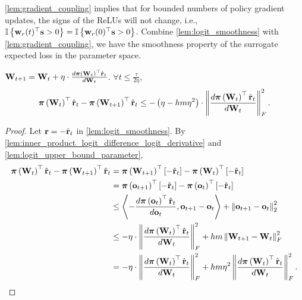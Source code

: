 \cref{lem:gradient_coupling} implies that for bounded numbers of policy gradient updates, the signs of the ReLUs will not change, i.e., ${\mathbb{I}}\left\{ {\mathbf{w}}_r(t)^\top {\mathbf{s}} > 0 \right\} = {\mathbb{I}}\left\{ {\mathbf{w}}_r(0)^\top {\mathbf{s}} > 0 \right\}$. Combine \cref{lem:logit_smoothness} with \cref{lem:gradient_coupling}, we have the smoothness property of the surrogate expected loss in the parameter space.
\begin{lem}
\label{lem:empirically_expected_reward_parameter_smoothness}
    ${\mathbf{W}}_{t+1} = {\mathbf{W}}_t + \eta \cdot \frac{d {\boldsymbol{\pi}}\left({\mathbf{W}}_t\right)^\top \hat{{\mathbf{r}}}_t}{d {\mathbf{W}}_t}$. $\forall t \le \frac{\tau}{ 2 \eta }$,
\begin{equation}
\label{eq:parameter_smoothness}
\begin{split}
    {\boldsymbol{\pi}}\left( {\mathbf{W}}_t \right)^\top \hat{{\mathbf{r}}}_t - {\boldsymbol{\pi}}\left( {\mathbf{W}}_{t+1} \right)^\top \hat{{\mathbf{r}}}_t \le - \left( \eta - h m \eta^2 \right) \cdot \left\| \frac{d {\boldsymbol{\pi}}\left( {\mathbf{W}}_t \right)^\top \hat{{\mathbf{r}}}_t}{d {\mathbf{W}}_t} \right\|_F^2.
\end{split}
\end{equation}
\end{lem}
\begin{proof}
   Let ${\mathbf{r}} = - \hat{{\mathbf{r}}}_t$ in \cref{lem:logit_smoothness}. By \cref{lem:inner_product_logit_difference_logit_derivative} and \cref{lem:logit_upper_bound_parameter},
\begin{equation*}
\begin{split}
    {\boldsymbol{\pi}}\left( {\mathbf{W}}_t \right)^\top \hat{{\mathbf{r}}}_t - {\boldsymbol{\pi}}\left( {\mathbf{W}}_{t+1} \right)^\top \hat{{\mathbf{r}}}_t &= {\boldsymbol{\pi}}\left( {\mathbf{W}}_{t+1} \right)^\top \left[ - \hat{{\mathbf{r}}}_t \right] - {\boldsymbol{\pi}}\left( {\mathbf{W}}_t \right)^\top \left[ - \hat{{\mathbf{r}}}_t \right]  \\
    &= {\boldsymbol{\pi}}\left( {\mathbf{o}}_{t+1} \right)^\top \left[ - \hat{{\mathbf{r}}}_t \right] - {\boldsymbol{\pi}}\left( {\mathbf{o}}_t \right)^\top \left[ - \hat{{\mathbf{r}}}_t \right] \\
    &\le \left\langle - \frac{d {\boldsymbol{\pi}}\left( {\mathbf{o}}_t \right)^\top \hat{{\mathbf{r}}}_t}{d {\mathbf{o}}_t}, {\mathbf{o}}_{t+1} - {\mathbf{o}}_t \right\rangle + \left\| {\mathbf{o}}_{t+1} - {\mathbf{o}}_t  \right\|_2^2 \\
    &\le - \eta \cdot \left\| \frac{d {\boldsymbol{\pi}}\left({\mathbf{W}}_t\right)^\top \hat{{\mathbf{r}}}_t}{d {\mathbf{W}}_t} \right\|_F^2 + h m \left\| {\mathbf{W}}_{t+1} - {\mathbf{W}}_t \right\|_F^2 \\
    &= - \eta \cdot \left\| \frac{d {\boldsymbol{\pi}}\left({\mathbf{W}}_t\right)^\top \hat{{\mathbf{r}}}_t}{d {\mathbf{W}}_t} \right\|_F^2 + h m \eta^2 \left\| \frac{d {\boldsymbol{\pi}}\left({\mathbf{W}}_t\right)^\top \hat{{\mathbf{r}}}_t}{d {\mathbf{W}}_t} \right\|_F^2. \qedhere
\end{split}
\end{equation*}
\end{proof}

